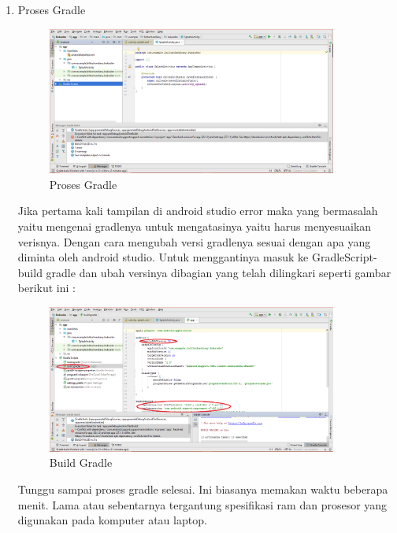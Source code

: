\begin{enumerate}
\begin{enumerate}
    \end{enumerate}
      \item  Proses Gradle 
    \begin{figure}[H]
        \centering
        \includegraphics[width=0.9\textwidth]{figures/android28.png}
        \caption{Proses Gradle}
        \label{print}
        \end{figure}
    \pqr Jika pertama kali tampilan di android studio error maka yang bermasalah yaitu mengenai gradlenya untuk mengatasinya yaitu harus menyesuaikan verisnya. Dengan cara mengubah versi gradlenya sesuai dengan apa yang diminta oleh android studio. Untuk menggantinya masuk ke GradleScript-build gradle dan ubah versinya dibagian yang telah dilingkari seperti gambar berikut ini :
    \begin{figure}[H]
        \centering
        \includegraphics[width=0.9\textwidth]{figures/android29.png}
        \caption{Build Gradle}
        \label{print}
        \end{figure}
    
    \par Tunggu sampai proses gradle selesai. Ini biasanya memakan waktu beberapa menit. Lama atau sebentarnya tergantung spesifikasi ram dan prosesor yang digunakan pada komputer atau laptop.
    

\end{enumerate}
